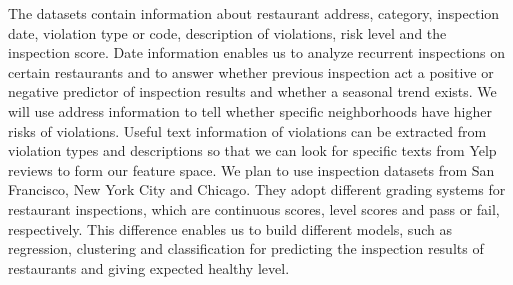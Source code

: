 \documentclass[12pt]{article}%
\begin{document}
The datasets contain information about restaurant address, category, inspection date, violation type or code, description of violations, risk level and the inspection score. Date information enables us to analyze recurrent inspections on certain restaurants and to answer whether previous inspection act a positive or negative predictor of inspection results and whether a seasonal trend exists. We will use address information to tell whether specific neighborhoods have higher risks of violations. Useful text information of violations can be extracted from violation types and descriptions so that we can look for specific texts from Yelp reviews to form our feature space. We plan to use inspection datasets from San Francisco, New York City and Chicago. They adopt different grading systems for restaurant inspections, which are continuous scores, level scores and pass or fail, respectively. This difference enables us to build different models, such as regression, clustering and classification for predicting the inspection results of restaurants and giving expected healthy level.
\end{document}
